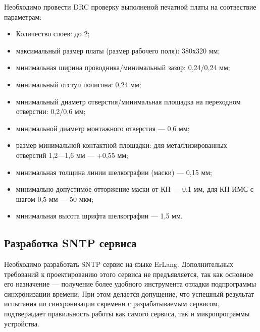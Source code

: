 \begin{par}
Необходимо провести DRC проверку выполненой печатной платы на соотвествие параметрам:
\begin{itemize}
    \item{} Количество слоев: до 2;
    \item{} максимальный размер платы (размер рабочего поля): 380х320 мм;
    \item{} минимальная ширина проводника/минимальный зазор: 0,24/0,24 мм;
    \item{} минимальный отступ полигона: 0,24 мм;
    \item{} минимальный диаметр отверстия/минимальная площадка на переходном отверстии: 0,2/0,6 мм;
    \item{} минимальной диаметр монтажного отверстия — 0,6 мм;
    \item{} размер минимальной контактной площадки: для металлизированных отверстий 1,2—1,6 мм — +0,55 мм;
    \item{} минимальная толщина линии шелкографии (маски) — 0,15 мм;
    \item{} минимально допустимое отторжение маски от КП — 0,1 мм, для КП ИМС с шагом 0,5 мм — 50 мкм;
    \item{} минимальная высота шрифта шелкографии — 1,5 мм.
\end{itemize}
\end{par}

\subsection{Разработка SNTP сервиса}
\begin{par}
Необходимо разработать SNTP сервис на языке ErLang. Дополнительных требований к проектированию этого сервиса
не предъявляется, так как основное его назначение --- получение более удобного
инструмента отладки подпрограммы синхронизации времени.
При этом делается допущение, что успешный результат испытания по синхронизации свремени с разрабатываемым
сервисом, подтверждает правильность работы как самого сервиса, так и микропрограммы устройства.
\end{par}
\newpage{}
